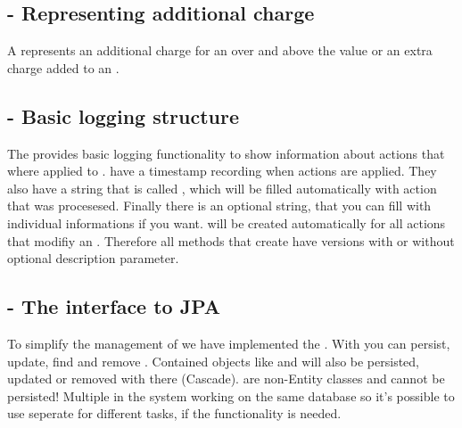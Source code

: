 \subsection{ - Representing additional charge}
A  represents an additional charge for an  over and above the  value or an extra charge added to an .

\subsection{ - Basic logging structure}
The  provides basic logging functionality to show information about actions that where applied to .  have a timestamp recording when actions are applied. They also have a string that is called , which will be filled automatically with action that was procesesed. Finally there is an optional  string, that you can fill with individual informations if you want.  will be created automatically for all actions that modifiy an . Therefore all methods that create  have versions with or without optional description parameter.

\subsection{ - The interface to JPA}
To simplify the management of  we have implemented the . With  you can persist, update, find and remove . Contained objects like  and  will also be persisted, updated or removed with there  (Cascade).  are non-Entity classes and cannot be persisted! Multiple  in the system working on the same database so it's possible to use seperate  for different tasks, if the functionality is needed. 

